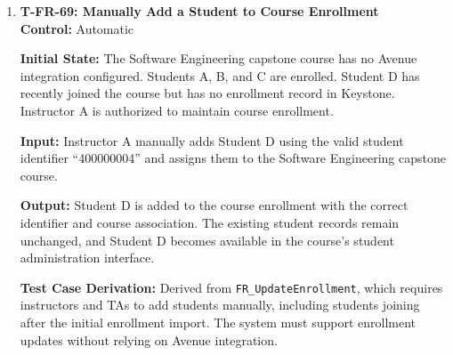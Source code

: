 \documentclass[12pt, titlepage]{article}
\begin{document}
\begin{enumerate}
\textbf{Input:} Instructor A imports the new enrollment list and reviews the enrollment discrepancies.

\textbf{Output:} Student B is flagged for instructor review because they are absent from the latest enrollment list. Student B remains enrolled and remains a member of Team Amazing Engineers until course staff explicitly confirm their removal.

\textbf{Test Case Derivation:} Derived from \texttt{FR\_EnrollmentDiscrepency}. The system must identify students missing from the latest enrollment list without automatically removing them. Let $E$ be the existing enrollment and $I$ the imported list:
\[
E=\{A,B,C,D\},
\qquad I=\{A,C,D\}.
\]

The discrepancy set is

\[
E\setminus I=\{B\}.
\]

Student B must therefore be flagged, but their enrollment and team membership must be preserved until confirmed removal.

\textbf{How Test Will Be Performed:} Configure the existing enrollment and team memberships. Using Playwright, import the updated list and inspect the preview. Verify that Student B is flagged. Confirm that Student B remains in the course and Team Amazing Engineers without a separate removal confirmation.

\item \label{T-FR-69}\textbf{T-FR-69: Manually Add a Student to Course Enrollment}\\

\textbf{Control:} Automatic

\textbf{Initial State:} The Software Engineering capstone course has no Avenue integration configured. Students A, B, and C are enrolled. Student D has recently joined the course but has no enrollment record in Keystone. Instructor A is authorized to maintain course enrollment.

\textbf{Input:} Instructor A manually adds Student D using the valid student identifier ``400000004'' and assigns them to the Software Engineering capstone course.

\textbf{Output:} Student D is added to the course enrollment with the correct identifier and course association. The existing student records remain unchanged, and Student D becomes available in the course's student administration interface.

\textbf{Test Case Derivation:} Derived from \texttt{FR\_UpdateEnrollment}, which requires instructors and TAs to add students manually, including students joining after the initial enrollment import. The system must support enrollment updates without relying on Avenue integration.


\end{enumerate}
\end{document}
